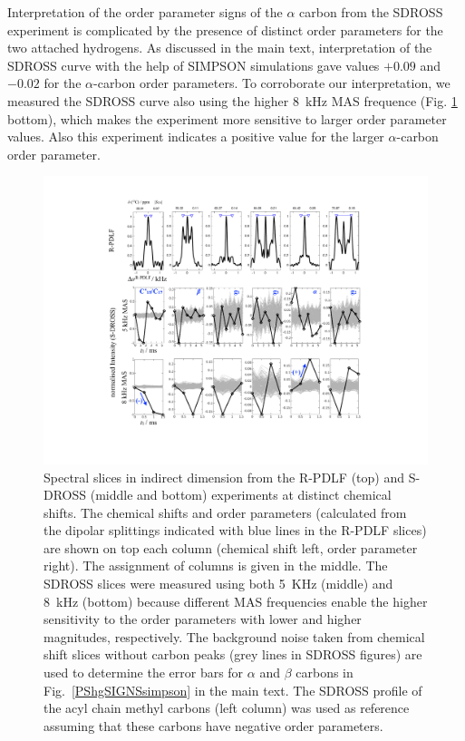 \documentclass[journal=jpcbfk,manuscript=article]{achemso}
\begin{document}
Interpretation of the order parameter signs of the $\alpha$ carbon from the SDROSS experiment
is complicated by the presence of distinct order parameters for the two attached hydrogens.
As discussed in the main text, interpretation of the SDROSS curve with the help of SIMPSON
simulations gave values $+0.09$ and $-0.02$ for the $\alpha$-carbon order parameters.
To corroborate our interpretation, we measured the SDROSS curve also using the higher 8~kHz
MAS frequence (Fig. \ref{DPslices} bottom), which makes the experiment more sensitive to larger order parameter values.
Also this experiment indicates a positive value for the larger $\alpha$-carbon order parameter.
\begin{figure}[]
  \includegraphics[width=\textwidth]{../Figs/SI_man.pdf}
  \caption{\label{DPslices}
    Spectral slices in indirect dimension from the R-PDLF (top) and S-DROSS (middle and bottom) experiments at distinct chemical shifts.
    The chemical shifts and order parameters (calculated from the dipolar splittings indicated with blue lines in the R-PDLF slices)
    are shown on top each column (chemical shift left, order parameter right).
    The assignment of columns is given in the middle.  
    The SDROSS slices were measured using both 5~KHz (middle) and 8~kHz (bottom) because different MAS frequencies enable the
    higher sensitivity to the order parameters with lower and higher magnitudes, respectively.
    The background noise taken from chemical shift slices without carbon peaks (grey lines in SDROSS figures)
    are used to determine the error bars for $\alpha$ and $\beta$ carbons in Fig.~\ref{PShgSIGNSsimpson} in the main text.
    The SDROSS profile of the acyl chain methyl carbons (left column) was used as reference assuming that these carbons have negative order parameters.  
  }
\end{figure}
\end{document}
